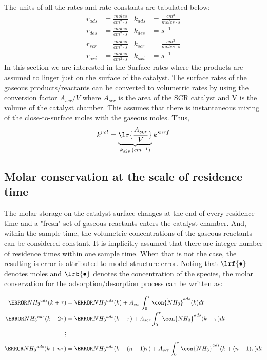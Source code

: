 The units of all the rates and rate constants are tabulated below:
\begin{align*}
    r_{ads} &= \frac{moles}{cm^2 \cdot s} &
    k_{ads} &= \frac{cm^3}{moles \cdot s} \\
    r_{des} &= \frac{moles}{cm^2 \cdot s} &
    k_{des} &= s^{-1} \\
    r_{scr} &= \frac{moles}{cm^2 \cdot s} &
    k_{scr} &= \frac{cm^3}{moles \cdot s} \\
    r_{oxi} &= \frac{moles}{cm^2 \cdot s} &
    k_{oxi} &= s^{-1}
\end{align*}
In this section we are interested in the Surface rates where the products are assumed to linger just on the
surface of the catalyst. The surface rates of the gaseous products/reactants can be converted to volumetric rates by
using the conversion factor $A_{scr}/V$ where $A_{scr}$ is the area of the SCR catalyst and V is the volume of the
catalyst chamber. This assumes that there is instantaneous mixing of the close-to-surface moles with the gaseous moles.
Thus,
\begin{align}
    k^{vol} = \underbrace{\lr{\frac{A_{scr}}{V}}}_{k_{s2v} \, (cm^{-1})} k^{surf}
\end{align}
\subsection{Molar conservation at the scale of residence time}

The molar storage on the catalyst surface changes at the end of every residence time and a "fresh" set of gaseous
reactants enters the catalyst chamber. And, within the sample time, the volumetric concentrations of the gaseous
reactants can be considered constant.  It is implicitly
assumed that there are integer number of residence times within one sample time. When that is not the case, the
resulting is error is attributed to model structure error. Noting that $\lrf{\bullet}$ denotes moles and $\lrb{\bullet}$ denotes the concentration of the species, the molar conservation for the adsorption/desorption process can be written as:

\begin{align*}
    \mol{NH_3}^{ads} (k + \tau) &= \mol{NH_3}^{ads} (k) + A_{scr} \int_{0}^{\tau} \dot{\con{NH_3}}^{ads} (k) dt\\
    \mol{NH_3}^{ads} (k + 2\tau) &= \mol{NH_3}^{ads} (k + \tau) + A_{scr} \int_{0}^{\tau} \dot{\con{NH_3}}^{ads} (k + \tau) dt\\
    \vdots&\\
    \mol{NH_3}^{ads} (k + n\tau) &= \mol{NH_3}^{ads} (k + (n-1)\tau) + A_{scr} \int_{0}^{\tau} \dot{\con{NH_3}}^{ads} (k + (n-1)\tau) dt
\end{align*}


